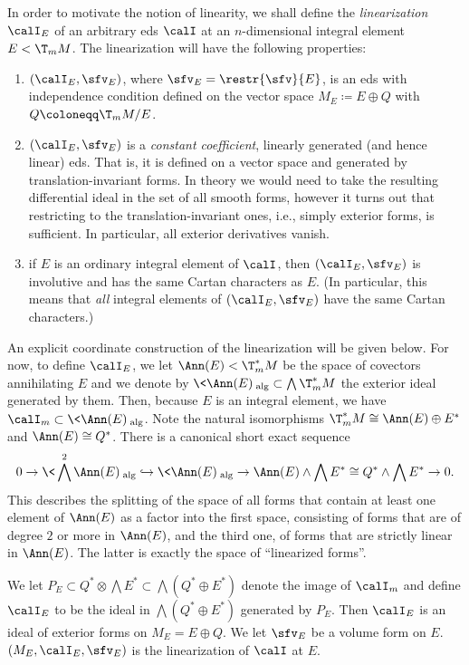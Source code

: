 In order to motivate the notion of linearity, we shall define the \emph{linearization} $\calI_E$ of an arbitrary \gls{eds} $\calI$ at an $n$-dimensional integral element $E<\T_m M$. The linearization will have the following properties:
\begin{enumerate}[label=(\roman*)]
    \item $(\calI_E,\sfv_E)$, where $\sfv_E=\restr{\sfv}{E}$, is an \gls{eds} with independence condition defined on the vector space $M_E\coloneqq E\oplus Q$ with $Q\coloneqq \T_m M\slash E$. 
    \item $(\calI_E,\sfv_E)$ is a \emph{constant coefficient}, linearly generated (and hence linear) \gls{eds}. That is, it is defined on a vector space and generated by translation-invariant forms. In theory we would need to take the resulting differential ideal in the set of all smooth forms, however it turns out that restricting to the translation-invariant ones, i.e., simply exterior forms, is sufficient. In particular, all exterior derivatives vanish.
    \item if $E$ is an ordinary integral element of $\calI$, then $(\calI_E,\sfv_E)$ is involutive and has the same Cartan characters as $E$. (In particular, this means that \emph{all} integral elements of $(\calI_E,\sfv_E)$ have the same Cartan characters.)
\end{enumerate}
An explicit coordinate construction of the linearization will be given below. For now, to define $\calI_E$, we let $\Ann(E)<\T^\ast_m M$ be the space of covectors annihilating $E$ and we denote by $\<\Ann(E)\>_{\mathrm{alg}}\subset \bigwedge\T^\ast_m M$ the exterior ideal generated by them. Then, because $E$ is an integral element, we have $\calI_m\subset \<\Ann(E)\>_{\mathrm{alg}}$. Note the natural isomorphisms $\T^\ast_m M\cong \Ann(E)\oplus E^\ast$ and $\Ann(E)\cong Q^\ast$. There is a canonical short exact sequence 
\[0\to \<\bigwedge^2 \Ann(E)\>_{\mathrm{alg}}\hookrightarrow \<\Ann(E)\>_{\mathrm{alg}}\to \Ann(E)\wedge \bigwedge E^\ast\cong Q^\ast\wedge\bigwedge E^\ast\to 0.\]
This describes the splitting of the space of all forms that contain at least one element of $\Ann(E)$ as a factor into the first space, consisting of forms that are of degree $2$ or more in $\Ann(E)$, and the third one, of forms that are strictly linear in $\Ann(E)$. The latter is exactly the space of ``linearized forms''.

\begin{defn}\label{def linearized eds}
    We let $P_E\subset Q^\ast\otimes \bigwedge E^\ast\subset \bigwedge(Q^\ast\oplus E^\ast)$ denote the image of $\calI_m$ and define $\calI_E$ to be the ideal in $\bigwedge(Q^\ast\oplus E^\ast)$ generated by $P_E$. Then $\calI_E$ is an ideal of exterior forms on $M_E=E\oplus Q$. We let $\sfv_E$ be a volume form on $E$.
    $(M_E,\calI_E,\sfv_E)$ is the linearization of $\calI$ at $E$.
\end{defn}

